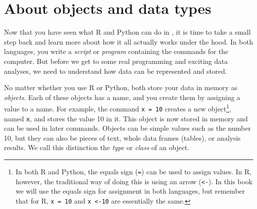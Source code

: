 \newcommand{\fnarrow}{\footnote{In both R and Python, the equals
  sign (\texttt{=}) can be used to assign values. In R, however, the
  traditional way of doing this is using an arrow (\texttt{\textless-}). In
  this book we will use the equals sign for assignment in both
  languages, but remember that for R, \texttt{x = 10} and
  \texttt{x \textless-10} are essentially the same.}}


\section{About objects and data types}
\label{sec:datatypes}

Now that you have seen what R and Python can do in ,
it is time to take a small step back and learn more about how it all actually works under the hood.
In both languages, you write a
\emph{script} or \emph{program} containing the commands for the
computer.  But before we get to
some real programming and exciting data analyses, we need to understand
how data can be represented and stored.

No matter whether you use R or Python, both store your data in memory as \emph{objects}.
Each of these objects has a name, and you create them by
assigning a value to a name. For example, the command \texttt{x = 10}
creates a new object\fnarrow, named \texttt{x}, and stores the value 10
in it.  This object is now stored in memory and can be used in later
commands. Objects can be simple values such as the number 10, but they can also
be pieces of text, whole data frames (tables), or analysis results.
We call this distinction the \emph{type} or \emph{class} of an
object. 


